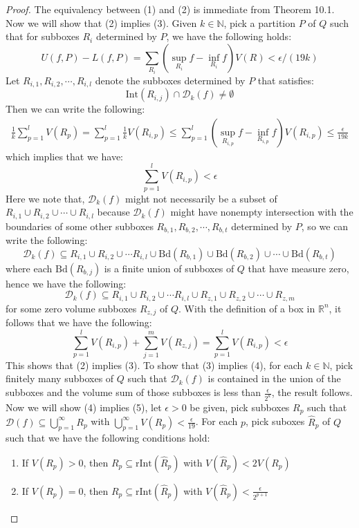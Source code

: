 \documentclass[15pt]{book}
\theoremstyle{break}
\theoremstyle{break}
\newcommand{\R}{\mathbb{R}}
\newcommand{\N}{\mathbb{N}}
\newcommand{\D}{\mathcal{D}}
\newcommand{\Int}{\text{Int}}
\newcommand{\Bd}{\text{Bd}}
\begin{document}
\begin{proof}
The equivalency between (1) and (2) is immediate from Theorem 10.1. Now we will show that (2) implies (3). Given $k \in \N$, pick a partition $P$ of $Q$ such that for subboxes $R_i$ determined by $P$, we have the following holds: $$U(f,P) - L(f,P)=\sum_{R_i}\left(\sup_{R_i} f- \inf_{R_i} f\right)V(R) < \epsilon/(19k)$$
Let $R_{i,1},R_{i,2},\cdots, R_{i,l}$ denote the subboxes determined by $P$ that satisfies: 
$$\Int(R_{i,j}) \cap \D_k(f)\neq \emptyset$$ 
Then we can write the following:
\begin{align*}
\frac{1}{k}\sum_{p=1}^l V(R_p) = \sum_{p=1}^l \frac{1}{k} V(R_{i,p}) \leq \sum_{p=1}^l \left(\sup_{R_{i,p}} f - \inf_{R_{i,p}} f\right) V(R_{i,p}) \leq \frac{\epsilon}{19k}
\end{align*}
which implies that we have:
$$\sum_{p=1}^l V(R_{i,p}) < \epsilon$$
Here we note that, $\D_k(f)$ might not necessarily be a subset of $R_{i,1} \cup R_{i,2}\cup\cdots\cup R_{i,l}$ because $\D_k(f)$ might have nonempty intersection with the boundaries of some other subboxes $R_{b,1},R_{b,2},\cdots, R_{b,t}$ determined by $P$, so we can write the following:
$$\D_k(f)\subseteq R_{i,1}\cup R_{i,2} \cup \cdots R_{i,l} \cup\Bd(R_{b,1}) \cup \Bd(R_{b,2}) \cup \cdots \cup \Bd(R_{b,t})$$ 
where each $\Bd(R_{b,j})$ is a finite union of subboxes of $Q$ that have measure zero, hence we have the following: $$\D_k(f) \subseteq R_{i,1}\cup R_{i,2} \cup \cdots R_{i,l} \cup  R_{z,1}\cup R_{z,2} \cup \cdots \cup R_{z,m}$$
for some zero volume subboxes $R_{z,j}$ of $Q$. With the definition of a box in $\R^n$, it follows that we have the following:
$$\sum_{p=1}^l V(R_{i,p}) + \sum_{j=1}^m V(R_{z,j}) = \sum_{p=1}^l V(R_{i,p})< \epsilon$$ 
This shows that (2) implies (3). To show that (3) implies (4), for each $k \in \N$, pick finitely many subboxes of $Q$ such that $\D_k(f)$ is contained in the union of the subboxes and the volume sum of those subboxes is less than $\frac{\epsilon}{2^k}$, the result follows. Now we will show (4) implies (5), let $\epsilon>0$ be given, pick subboxes $R_p$ such that $\D(f) \subseteq \bigcup_{p=1}^\infty R_p$ with $\bigcup_{p=1}^\infty V(R_p) < \frac{\epsilon}{19}$. For each $p$, pick suboxes $\hat{R}_p$ of $Q$ such that we have the following conditions hold: 
\begin{enumerate}[topsep=3pt,itemsep=-1ex,partopsep=1ex,parsep=1ex]
\item If $V(R_p) >0$, then $R_p \subseteq \text{rInt}(\hat{R}_p)$ with $V(\hat{R}_p) < 2V(R_p)$
\item If $V(R_p) = 0$, then $R_p \subseteq \text{rInt}(\hat{R}_p)$ with $V(\hat{R}_p) < \frac{\epsilon}{2^{p+1}}$

\end{enumerate}
\end{proof}
\end{document}
